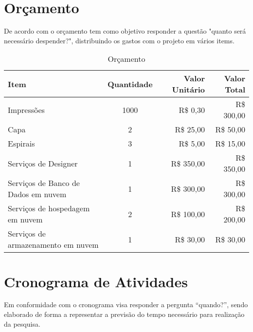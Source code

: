 \section{Orçamento} \label{sec:budget}

De acordo com \citep[p. 128]{LAKATOS2021:metodologia} o orçamento
tem como objetivo responder a questão "quanto será necessário
despender?", distribuindo os gastos com o projeto em vários items.

\begin{table}[H]
      \caption{Orçamento}
      \begin{tabular}{|p{6.4cm}|c|r|r|}
            \hline
            {\textbf{Item}}                         & {\textbf{Quantidade}} & {\textbf{Valor Unitário}} & {\textbf{Valor Total}} \\ \hline
            {{Impressões}}                          & {1000}                & {R\$ 0,30 }               & {R\$ 300,00}           \\ \hline
            {{Capa}}                                & {2}                   & {R\$ 25,00 }              & {R\$ 50,00}            \\ \hline
            {{Espirais}}                            & {3}                   & {R\$ 5,00 }               & {R\$ 15,00}            \\ \hline
            {{Serviços de Designer}}                & {1}                   & {R\$ 350,00 }             & {R\$ 350,00}           \\ \hline
            {{Serviços de Banco de Dados em nuvem}} & {1}                   & {R\$ 300,00 }             & {R\$ 300,00}           \\ \hline
            {{Serviços de hospedagem em nuvem}}     & {2}                   & {R\$ 100,00 }             & {R\$ 200,00}           \\ \hline
            {{Serviços de armazenamento em nuvem}}  & {1}                   & {R\$ 30,00 }              & {R\$ 30,00}            \\ \hline
      \end{tabular}
\end{table}

\section{Cronograma de Atividades} \label{sec:schedule_activities_table}

Em conformidade com \citep[p. 128]{LAKATOS2021:metodologia} o cronograma
visa responder a pergunta “quando?”, sendo elaborado de forma a
representar a previsão do tempo necessário para realização da pesquisa.

